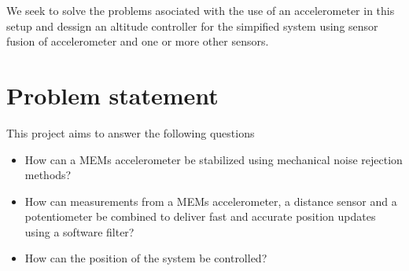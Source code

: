 We seek to solve the problems asociated with the use of an accelerometer in this setup and dessign an altitude controller for the simpified system using sensor fusion of accelerometer and one or more other sensors.

%
%

\section*{Problem statement}
This project aims to answer the following questions
\begin{itemize}
	\item How can a MEMs accelerometer be stabilized using mechanical noise rejection methods?
	\item How can measurements from a MEMs accelerometer, a distance sensor 
		and a potentiometer be combined to deliver fast and accurate position updates
		using a software filter?
	\item How can the position of the system be controlled?
\end{itemize}




